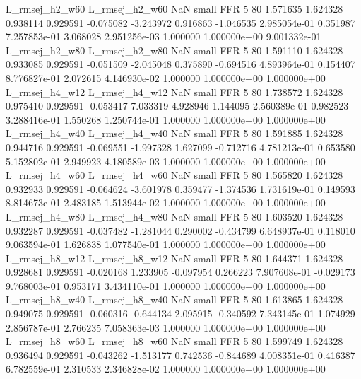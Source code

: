 L_rmsej_h2_w60 L_rmsej_h2_w60                   NaN      small      FFR                 5 80 1.571635       1.624328 0.938114       0.929591   -0.075082     -3.243972      0.916863    -1.046535   2.985054e-01  0.351987 7.257853e-01     3.068028   2.951256e-03            1.000000    1.000000e+00        9.001332e-01
L_rmsej_h2_w80 L_rmsej_h2_w80                   NaN      small      FFR                 5 80 1.591110       1.624328 0.933085       0.929591   -0.051509     -2.045048      0.375890    -0.694516   4.893964e-01  0.154407 8.776827e-01     2.072615   4.146930e-02            1.000000    1.000000e+00        1.000000e+00
L_rmsej_h4_w12 L_rmsej_h4_w12                   NaN      small      FFR                 5 80 1.738572       1.624328 0.975410       0.929591   -0.053417      7.033319      4.928946     1.144095   2.560389e-01  0.982523 3.288416e-01     1.550268   1.250744e-01            1.000000    1.000000e+00        1.000000e+00
L_rmsej_h4_w40 L_rmsej_h4_w40                   NaN      small      FFR                 5 80 1.591885       1.624328 0.944716       0.929591   -0.069551     -1.997328      1.627099    -0.712716   4.781213e-01  0.653580 5.152802e-01     2.949923   4.180589e-03            1.000000    1.000000e+00        1.000000e+00
L_rmsej_h4_w60 L_rmsej_h4_w60                   NaN      small      FFR                 5 80 1.565820       1.624328 0.932933       0.929591   -0.064624     -3.601978      0.359477    -1.374536   1.731619e-01  0.149593 8.814673e-01     2.483185   1.513944e-02            1.000000    1.000000e+00        1.000000e+00
L_rmsej_h4_w80 L_rmsej_h4_w80                   NaN      small      FFR                 5 80 1.603520       1.624328 0.932287       0.929591   -0.037482     -1.281044      0.290002    -0.434799   6.648937e-01  0.118010 9.063594e-01     1.626838   1.077540e-01            1.000000    1.000000e+00        1.000000e+00
L_rmsej_h8_w12 L_rmsej_h8_w12                   NaN      small      FFR                 5 80 1.644371       1.624328 0.928681       0.929591   -0.020168      1.233905     -0.097954     0.266223   7.907608e-01 -0.029173 9.768003e-01     0.953171   3.434110e-01            1.000000    1.000000e+00        1.000000e+00
L_rmsej_h8_w40 L_rmsej_h8_w40                   NaN      small      FFR                 5 80 1.613865       1.624328 0.949075       0.929591   -0.060316     -0.644134      2.095915    -0.340592   7.343145e-01  1.074929 2.856787e-01     2.766235   7.058363e-03            1.000000    1.000000e+00        1.000000e+00
L_rmsej_h8_w60 L_rmsej_h8_w60                   NaN      small      FFR                 5 80 1.599749       1.624328 0.936494       0.929591   -0.043262     -1.513177      0.742536    -0.844689   4.008351e-01  0.416387 6.782559e-01     2.310533   2.346828e-02            1.000000    1.000000e+00        1.000000e+00
